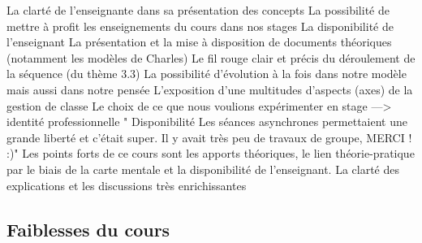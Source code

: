 \documentclass[
  french,
]{article}
\begin{document}
La clarté de l'enseignante dans sa présentation des concepts
La possibilité de mettre à profit les enseignements du cours dans nos stages
La disponibilité de l'enseignant
La présentation et la mise à disposition de documents théoriques (notamment les modèles de Charles)
Le fil rouge clair et précis du déroulement de la séquence (du thème 3.3)
La possibilité d'évolution à la fois dans notre modèle mais aussi dans notre pensée
L'exposition d'une multitudes d'aspects (axes) de la gestion de classe
Le choix de ce que nous voulions expérimenter en stage ---\textgreater{} identité professionnelle "
Disponibilité
Les séances asynchrones permettaient une grande liberté et c'était super.
Il y avait très peu de travaux de groupe, MERCI ! :)"
Les points forts de ce cours sont les apports théoriques, le lien théorie-pratique par le biais de la carte mentale et la disponibilité de l'enseignant.
La clarté des explications et les discussions très enrichissantes

\hypertarget{faiblesses-du-cours}{%
\subsection{Faiblesses du cours}\label{faiblesses-du-cours}}
\end{document}
